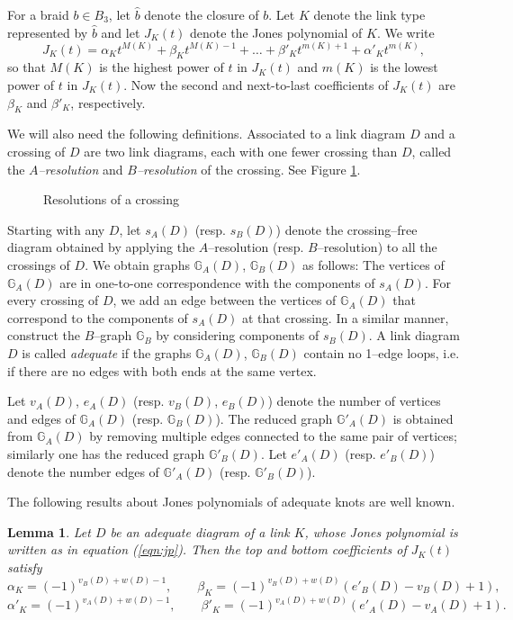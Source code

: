 \documentclass[11pt]{amsart}
\newcommand{\GA}{{\mathbb{G}_A}}
\newcommand{\GB}{{\mathbb{G}_B}}
\newcommand{\GRA}{{\mathbb{G}'_A}}
\newcommand{\GRB}{{\mathbb{G}'_B}}
\theoremstyle{plain}
\newtheorem{lemma}[theorem]{Lemma}
\theoremstyle{definition}
\begin{document}
For a braid $b\in B_3$, let $\hat {b}$ denote the closure of $b$. Let
$K$ denote the link type represented by ${\hat b}$ and let $J_{K}(t)$
denote the Jones polynomial of $K$. We write
\begin{equation}
J_{K}(t)= \alpha_K t^{M(K)}+ \beta_K t^{M(K)-1}+ \ldots + \beta'_K
t^{m(K)+1}+ \alpha'_K t^{m(K)},
\label{eqn:jp}
\end{equation}
so that $M(K)$ is the highest power of $t$ in $J_K(t)$ and $m(K)$ is
the lowest power of $t$ in $J_K(t)$.  Now the second and next-to-last
coefficients of $J_{K}(t)$ are $\beta_K$ and $\beta'_K$, respectively.

We will also need the following definitions.  Associated to a link
diagram $D$ and a crossing of $D$ are two link diagrams, each with one
fewer crossing than $D$, called the \emph{$A$--resolution} and
\emph{$B$--resolution} of the crossing.  See Figure
\ref{fig:splicing}.
	
\begin{figure}[ht] 
\centerline{}
\caption{Resolutions of a crossing}
\label{fig:splicing}
\end{figure}

Starting with any $D$, let $s_A(D)$ (resp. $s_B(D)$) denote the
crossing--free diagram obtained by applying the $A$--resolution (resp.
$B$--resolution) to all the crossings of $D$.  We obtain graphs
$\GA(D)$, $\GB(D)$ as follows: The vertices of $\GA (D)$ are in
one-to-one correspondence with the components of $s_A(D)$.  For every
crossing of $D$, we add an edge between the vertices of $\GA(D)$ that
correspond to the components of $s_A(D)$ at that crossing.  In a
similar manner, construct the $B$--graph $\GB$ by considering
components of $s_B(D)$.  A link diagram $D$ is called \emph{adequate}
if the graphs $\GA(D)$, $\GB(D)$ contain no 1--edge loops, i.e. if
there are no edges with both ends at the same vertex.

Let $v_A(D)$, $e_A(D)$ (resp. $v_B(D)$, $e_B(D)$) denote the number of
vertices and edges of $\GA(D)$ (resp. $\GB(D)$).  The reduced graph
$\GRA(D)$ is obtained from $\GA(D)$ by removing multiple edges
connected to the same pair of vertices; similarly one has the reduced
graph $\GRB(D)$.  Let $e'_A(D)$ (resp. $e'_B(D)$) denote the number
edges of $\GRA(D)$ (resp. $\GRB(D)$).

The following results about Jones polynomials of adequate knots are
well known.

\begin{lemma}\label{lemma:adequate-jones}
Let $D$ be an adequate diagram of a link $K$, whose Jones polynomial
is written as in equation (\ref{eqn:jp}). Then the top and bottom
coefficients of $J_K(t)$ satisfy
$$\alpha_K = (-1)^{v_B(D) + w(D) -1}, \qquad
  \beta_{K} = (-1)^{v_B(D) + w(D)} (e'_B(D) - v_B(D) + 1),$$
$$\alpha'_K = (-1)^{v_A(D) + w(D) -1} , \qquad
	\beta'_{K} = (-1)^{v_A(D) + w(D)} (e'_A(D) - v_A(D) + 1).$$
\end{lemma}
\end{document}
